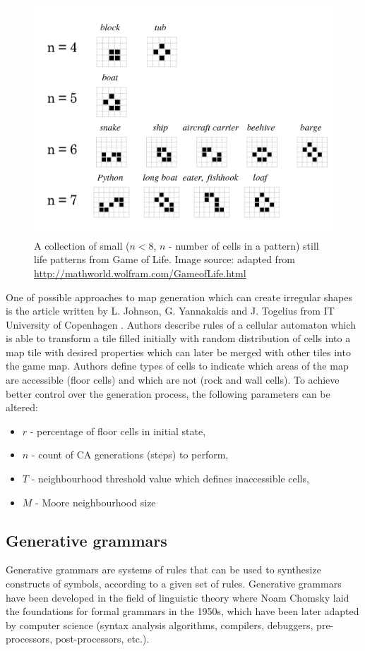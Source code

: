 \documentclass[12pt]{report}
\newcommand{\td}[1]{\todo[inline]{TO DO: #1}}
\begin{document}
\begin{figure}[h]
	\centering
	\includegraphics[width=0.6\linewidth]{images/stilllife}
	\caption{A collection of small ($n<8$, $n$ - number of cells in a pattern) still life patterns from Game of Life. Image source: adapted from \url{http://mathworld.wolfram.com/GameofLife.html}}
	\label{fig:stilllife}
\end{figure}


One of possible approaches to map generation which can create irregular shapes is the article written by L. Johnson, G. Yannakakis and J. Togelius from IT University of Copenhagen \autocite{johnson2010cellular}. Authors describe rules of a cellular automaton which is able to transform a tile filled initially with random distribution of cells into a map tile with desired properties which can later be merged with other tiles into the game map. Authors define types of cells to indicate which areas of the map are accessible (floor cells) and which are not (rock and wall cells). To achieve better control over the generation process, the following parameters can be altered: 

\begin{itemize}
	\item $r$ - percentage of floor cells in initial state,
	\item $n$ - count of CA generations (steps) to perform,
	\item $T$ - neighbourhood threshold value which defines inaccessible cells, 
	\item $M$ - Moore neighbourhood size
\end{itemize}

\td{expand on JYT10}

\subsection{Generative grammars}

Generative grammars are systems of rules that can be used to synthesize constructs of symbols, according to a given set of rules. Generative grammars have been developed in the field of linguistic theory where Noam Chomsky laid the foundations for formal grammars in the 1950s, which have been later adapted by computer science (syntax analysis algorithms, compilers, debuggers, pre-processors, post-processors, etc.).
\end{document}
